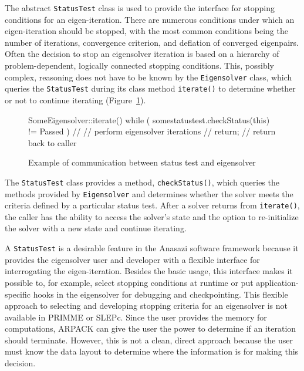 \documentclass[acmtoms]{acmtrans2m}
\newcommand{\aspace}[1]{\texttt{#1}}
\begin{document}
The abstract \aspace{StatusTest} class is used to provide the interface for stopping 
conditions for an eigen-iteration. There are numerous conditions under which an eigen-iteration 
should be stopped, with the most common conditions being the number of iterations,
convergence criterion, and deflation of converged eigenpairs.
Often the decision to stop an eigensolver iteration is based on a hierarchy 
of problem-dependent, logically connected stopping conditions.
This, possibly complex, reasoning does not have to be known by the \aspace{Eigensolver} class,
which queries the \aspace{StatusTest} during its class method \aspace{iterate()} to determine 
whether or not to continue iterating (Figure~\ref{fig:comm}).
\begin{figure}[htb]
\begin{center}
\begin{boxedverbatim}
SomeEigensolver::iterate() {
  while ( somestatustest.checkStatus(this) != Passed ) {
    //
    // perform eigensolver iterations
    //
  }
  return;  // return back to caller
}
\end{boxedverbatim}
\end{center}
\caption{Example of communication between status test and eigensolver}
\label{fig:comm}
\end{figure}
The \aspace{StatusTest} class provides a method, \verb!checkStatus()!, which queries the methods provided by
\aspace{Eigensolver} and determines whether the solver meets the criteria defined by a particular 
status test. After a solver returns from \verb!iterate()!, the caller has the ability to access the
solver's state and the option to re-initialize the solver with a new state and continue iterating.

A \aspace{StatusTest} is a desirable feature in the Anasazi software framework because it
provides the eigensolver user and developer with a flexible interface for interrogating
the eigen-iteration. Besides the basic usage, this interface makes it possible to, for
example, select stopping conditions at runtime or put application-specific hooks in the
eigensolver for debugging and checkpointing. This flexible approach to selecting and
developing stopping criteria for an eigensolver is not available in PRIMME or SLEPc.
Since the user provides the memory for computations, ARPACK can give the user the power to
determine if an iteration should terminate. However, this is not a clean, direct approach
because the user must know the data layout to determine where the information is for
making this decision.
\end{document}
